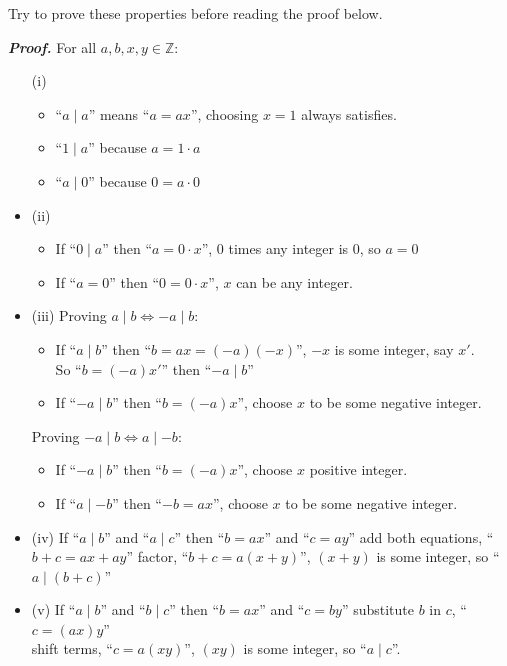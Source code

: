 \noindent
Try to prove these properties before reading the proof below.
\noindent
\begin{Proof}[Theorem 1.1]
    \textit{\textbf{Proof.}} For all $a, b, x,y \in \mathbb{Z}$:
    \begin{itemize}
        \item[(i)]  \begin {itemize}
        \item ``$a\mid a$'' means ``$a = ax$'', choosing $x = 1$ always satisfies.
        \item ``$1\mid a$'' because $a = 1\cdot a$
        \item ``$a\mid 0$'' because $0 = a\cdot 0$
    \end{itemize}
    \item[(ii)] \begin {itemize}
    \item If ``$0\mid a$'' then ``$a = 0\cdot x$'', 0 times any integer is 0, so $a = 0$
    \item If ``$a = 0$'' then ``$0 = 0\cdot x$'', $x$ can be any integer.
    \end {itemize}

    \noindent
    \item[(iii)]
    Proving $a\mid b \Longleftrightarrow -a\mid b$:
    \begin{itemize}
        \item If ``$a\mid b$'' then ``$b = ax = (-a)(-x)$'', $-x$ is some integer, say $x'$.\\
              So ``$b = (-a)x'$'' then ``$-a\mid b$''
        \item If ``$-a\mid b$'' then ``$b = (-a)x$'', choose $x$ to be some negative integer.\\
    \end{itemize}
    \vspace{-1em}
    Proving $-a\mid b \Longleftrightarrow a\mid -b$:
    \begin{itemize}
        \item If ``$-a\mid b$'' then ``$b = (-a)x$'', choose $x$ positive integer.
        \item If ``$a\mid -b$'' then ``$-b = ax$'', choose $x$ to be some negative integer.
    \end{itemize}
    \item[(iv)] If ``$a\mid b$'' and ``$a\mid c$'' then ``$b = ax$'' and ``$c = ay$'' add both equations, ``$b+c = ax+ay$''
    factor, ``$b+c = a(x+y)$'', $(x+y)$ is some integer, so ``$a\mid (b+c)$''

    \item[(v)] If ``$a\mid b$'' and ``$b\mid c$'' then ``$b = ax$'' and ``$c = by$'' substitute $b$ in $c$, ``$c = (ax)y$''\\
    shift terms, ``$c = a(xy)$'', $(xy)$ is some integer, so ``$a\mid c$''.
    \end{itemize}

\end{Proof}

